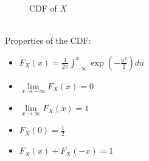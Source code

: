 \documentclass[journal, 12pt, twocolumn]{IEEEtran}
\begin{document}
\begin{enumerate}[label=\arabic{section}.\arabic*]
\begin{figure}[!ht]
            \caption{CDF of $X$}
            \label{fig:cdf_gau}
        \end{figure}
        \\
        Properties of the CDF:
        \begin{itemize}
            \item $F_X(x) = \frac{1}{2 \pi} \int_{-\infty}^{x}{\exp\left(-\frac{u^2}{2}\right)du}$
            \item $\lim\limits_{x \to -\infty} F_X(x) = 0$
            \item $\lim\limits_{x \to \infty} F_X(x) = 1$
            \item $F_X(0) = \frac{1}{2}$
            \item $F_X(x) + F_X(-x) = 1$
        \end{itemize}


\end{enumerate}
\end{document}
